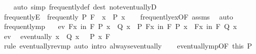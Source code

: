 \begin{isabellebody}
%
\isadelimproof
\ \ %
\endisadelimproof
%
\isatagproof
{}\isamarkupfalse%
\ {\isacharparenleft}{\kern0pt}auto\ simp{\isacharcolon}{\kern0pt}\ frequently{\isacharunderscore}{\kern0pt}def\ dest{\isacharcolon}{\kern0pt}\ not{\isacharunderscore}{\kern0pt}eventuallyD{\isacharparenright}{\kern0pt}%
\endisatagproof
{\isafoldproof}%
%
\isadelimproof
\isanewline
%
\endisadelimproof
\isanewline
{}\isamarkupfalse%
\ frequentlyE{\isacharcolon}{\kern0pt}\ \ {\isachardoublequoteopen}frequently\ P\ F{\isachardoublequoteclose}\ \ x\ \ {\isachardoublequoteopen}P\ x{\isachardoublequoteclose}\isanewline
%
\isadelimproof
\ \ %
\endisadelimproof
%
\isatagproof
{}\isamarkupfalse%
\ frequently{\isacharunderscore}{\kern0pt}ex{\isacharbrackleft}{\kern0pt}OF\ assms{\isacharbrackright}{\kern0pt}\ \isamarkupfalse%
\ auto%
\endisatagproof
{\isafoldproof}%
%
\isadelimproof
\isanewline
%
\endisadelimproof
\isanewline
{}\isamarkupfalse%
\ frequently{\isacharunderscore}{\kern0pt}mp{\isacharcolon}{\kern0pt}\isanewline
\ \ \ ev{\isacharcolon}{\kern0pt}\ {\isachardoublequoteopen}{\isasymforall}\isactrlsub Fx\ in\ F{\isachardot}{\kern0pt}\ P\ x\ {\isasymlongrightarrow}\ Q\ x{\isachardoublequoteclose}\ \ P{\isacharcolon}{\kern0pt}\ {\isachardoublequoteopen}{\isasymexists}\isactrlsub Fx\ in\ F{\isachardot}{\kern0pt}\ P\ x{\isachardoublequoteclose}\ \ {\isachardoublequoteopen}{\isasymexists}\isactrlsub Fx\ in\ F{\isachardot}{\kern0pt}\ Q\ x{\isachardoublequoteclose}\isanewline
%
\isadelimproof
%
\endisadelimproof
%
\isatagproof
{}\isamarkupfalse%
\ {\isacharminus}{\kern0pt}\isanewline
\ \ \isamarkupfalse%
\ ev\ \isamarkupfalse%
\ {\isachardoublequoteopen}eventually\ {\isacharparenleft}{\kern0pt}{\isasymlambda}x{\isachardot}{\kern0pt}\ {\isasymnot}\ Q\ x\ {\isasymlongrightarrow}\ {\isasymnot}\ P\ x{\isacharparenright}{\kern0pt}\ F{\isachardoublequoteclose}\isanewline
\ \ \ \ \isamarkupfalse%
\ {\isacharparenleft}{\kern0pt}rule\ eventually{\isacharunderscore}{\kern0pt}rev{\isacharunderscore}{\kern0pt}mp{\isacharparenright}{\kern0pt}\ {\isacharparenleft}{\kern0pt}auto\ intro{\isacharbang}{\kern0pt}{\isacharcolon}{\kern0pt}\ always{\isacharunderscore}{\kern0pt}eventually{\isacharparenright}{\kern0pt}\isanewline
\ \ \isamarkupfalse%
\ eventually{\isacharunderscore}{\kern0pt}mp{\isacharbrackleft}{\kern0pt}OF\ this{\isacharbrackright}{\kern0pt}\ P\ \isamarkupfalse%

\end{isabellebody}
